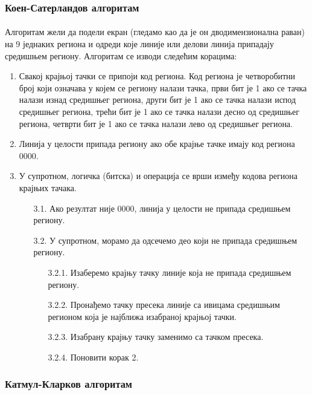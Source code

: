 \documentclass[12pt]{article}
\begin{document}
	\subsubsection{Коен-Сатерландов алгоритам}\label{koensaterland}
	\paragraph{}
	Алгоритам жели да подели екран (гледамо као да је он дводимензионална раван) на 9 једнаких региона и одреди које линије или делови линија припадају средишњем региону. Алгоритам се изводи следећим корацима:
	\begin{enumerate}
		\item Свакој крајњој тачки се припоји код региона. Код региона је четворобитни број који означава у којем се региону налази тачка, први бит је 1 ако се тачка налази изнад средишњег региона, други бит је 1 ако се тачка налази испод средишњег региона, трећи бит је 1 ако се тачка налази десно од средишњег региона, четврти бит је 1 ако се тачка налази лево од средишњег региона.
		\item Линија у целости припада региону ако обе крајње тачке имају код региона 0000.
		\item У супротном, логичка (битска) и операција се врши између кодова региона крајњих тачака.
		\begin{enumerate}
			\item[3.1.] Ако резултат није 0000, линија у целости не припада средишњем региону.
			\item[3.2.] У супротном, морамо да одсечемо део који не припада средишњем региону.
			\begin{enumerate}
				\item[3.2.1.] Изаберемо крајњу тачку линије која не припада средишњем региону.
				\item[3.2.2.] Пронађемо тачку пресека линије са ивицама средишњим регионом која је најближа изабраној крајњој тачки.
				\item[3.2.3.] Изабрану крајњу тачку заменимо са тачком пресека.
				\item[3.2.4.] Поновити корак 2.
			\end{enumerate}
		\end{enumerate}
	\end{enumerate}
	
	\subsubsection{Катмул-Кларков алгоритам}\label{katmulklark}
\end{document}
